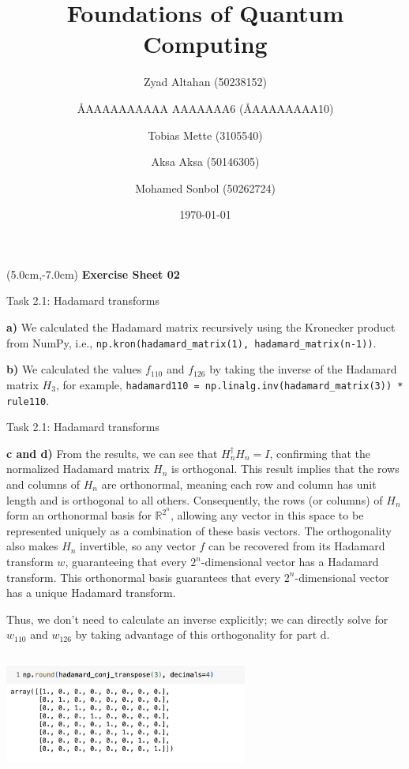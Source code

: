 \documentclass[aspectratio=169]{beamer}
\title{Foundations of Quantum Computing}
\author[]{Zyad Altahan (50238152) \and \AA{AAAAAAAAAA AAAAAAA}{6} (\AA{AAAAAAAA}{10}) \and Tobias Mette (3105540) \and Aksa Aksa (50146305) \and Mohamed Sonbol (50262724)}
\institute[]{Department of Computer Science \\ University of Bonn}
\date{\today}
\begin{document}
\begin{frame}
    \titlepage
    \begin{textblock*}{8cm}(5.0cm,-7.0cm)
        {\large \color{uwopurple}\hspace{0.66cm} \textbf{Exercise Sheet 02}} %
    \end{textblock*}
\end{frame}


\begin{frame}[fragile]{Task 2.1: Hadamard transforms}

\textbf{a)} We calculated the Hadamard matrix recursively using the Kronecker product from NumPy, i.e., \texttt{np.kron(hadamard\_matrix(1), hadamard\_matrix(n-1))}.

\vspace{1em}

\textbf{b)} We calculated the values $f_{110}$ and $f_{126}$ by taking the inverse of the Hadamard matrix $H_3$, for example, \texttt{hadamard110 = np.linalg.inv(hadamard\_matrix(3)) * rule110}.
\end{frame}

\begin{frame}[fragile]{Task 2.1: Hadamard transforms}

{\footnotesize
\textbf{c and d)} From the results, we can see that \( H_n^\dagger H_n = I \), confirming that the normalized Hadamard matrix \( H_n \) is orthogonal. This result implies that the rows and columns of \( H_n \) are orthonormal, meaning each row and column has unit length and is orthogonal to all others. Consequently, the rows (or columns) of \( H_n \) form an orthonormal basis for \( \mathbb{R}^{2^n} \), allowing any vector in this space to be represented uniquely as a combination of these basis vectors. The orthogonality also makes \( H_n \) invertible, so any vector \( f \) can be recovered from its Hadamard transform \( w \), guaranteeing that every \( 2^n \)-dimensional vector has a Hadamard transform. This orthonormal basis guarantees that every \( 2^n \)-dimensional vector has a unique Hadamard transform.

Thus, we don’t need to calculate an inverse explicitly; we can directly solve for $w_{110}$ and $w_{126}$ by taking advantage of this orthogonality for part d.
}

\includegraphics[width=08cm, height=04cm]{2.1_c_result.png}

\end{frame}
\end{document}

